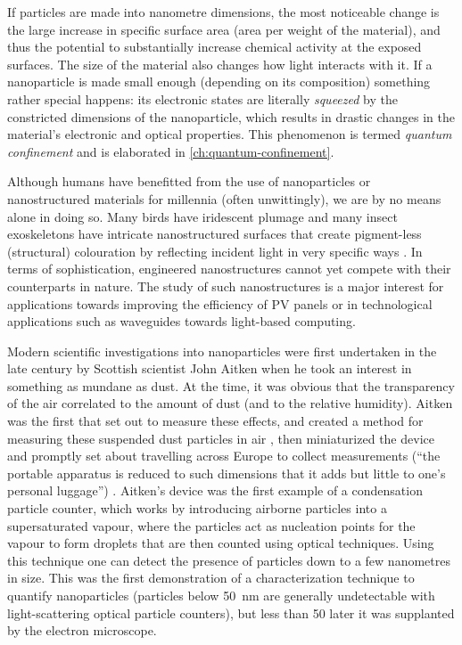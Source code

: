 \documentclass[webedition,openright,titles,swedish,english]{LuaUUThesis}\usepackage[]{graphicx}\usepackage[]{xcolor}
\begin{document}
If particles are made into nanometre dimensions, the most noticeable change is
the large increase in specific surface area (area per weight of the material),
and thus the potential to substantially increase chemical activity at the exposed surfaces.
The size of the material also changes how light interacts with it.
If a nanoparticle is made small enough (depending on its composition)
something rather special happens: its electronic states are literally
\emph{squeezed} by the constricted dimensions of the nanoparticle, which
results in drastic changes in the material's electronic and optical
properties.
This phenomenon is termed \emph{quantum confinement} and is elaborated
in \cref{ch:quantum-confinement}.

Although humans have benefitted from the use of nanoparticles or nanostructured materials
for millennia \cite{Montanarella2022} (often unwittingly), we are by no means
alone in doing so.
Many birds have iridescent plumage and many insect exoskeletons have intricate
nanostructured surfaces that create pigment-less (structural) colouration by reflecting
incident light in very specific ways \cite{Wolpert2009,Dunning2023}.
In terms of sophistication, engineered nanostructures cannot yet compete
with their counterparts in nature.
The study of such nanostructures is a major interest for applications towards
improving the efficiency of \gls{PV} panels or in technological applications such
as waveguides towards light-based computing.


Modern scientific investigations into nanoparticles were first undertaken
in the late  century by Scottish scientist John Aitken when he
took an interest in something as mundane as dust.
At the time, it was obvious that the transparency
of the air correlated to the amount of dust (and to the relative humidity).
Aitken was the first that set out to measure these effects, and created a method
for measuring these suspended dust particles in air \cite{Aitken1888},
then miniaturized the device and promptly set about travelling
across Europe to collect measurements (\enquote{the portable apparatus is reduced
to such dimensions that it adds but little to one's personal luggage}) \cite{Aitken1891}.
Aitken's device was the first example of a condensation particle counter,
which works by introducing airborne particles into a supersaturated vapour,
where the particles act as nucleation points for the vapour to form droplets
that are then counted using optical techniques.
Using this technique one can detect the presence of particles down to
a few nanometres in size.
This was the first demonstration of a characterization technique
to quantify nanoparticles (particles below \qty{50}{\nm} are generally
undetectable with light-scattering optical particle counters), but less than
\qty{50}{\years} later it was supplanted by the electron microscope.
\end{document}
